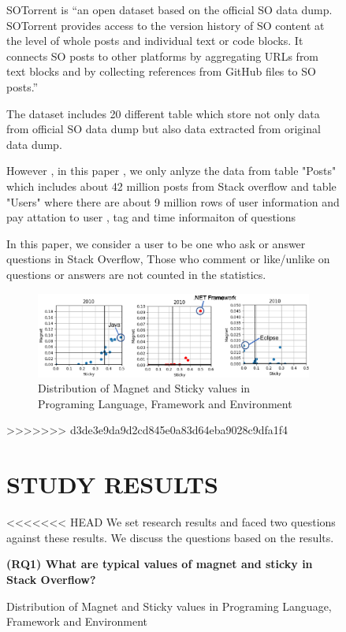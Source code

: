\documentclass[conference]{IEEEtran}
\begin{document}
\begin{figure}[t]
SOTorrent is “an open dataset based on the official SO data dump. SOTorrent provides access to the version history of SO content at the level of whole posts and individual text or code blocks. It connects SO posts to other platforms by aggregating URLs from text blocks and by collecting references from GitHub files to SO posts.”

The dataset includes 20 different table which store not only data from official SO data dump but also data extracted from original data dump.

However , in this paper , we only anlyze the data from table "Posts" which includes about 42 million posts from Stack overflow and table "Users" where there are about 9 million rows of user information and pay attation to user , tag and time informaiton of questions

In this paper, we consider a user to be one who ask or answer questions in Stack Overflow, Those who comment or like/unlike on questions or answers are not counted in the statistics.

\begin{figure}[t]
 \centering
 \includegraphics[width=.9\hsize]{img/2010magsti.eps}  
 \caption{Distribution of Magnet and Sticky values in Programing Language, Framework and Environment} 
 \label{plotframe2010} 
\end{figure}

>>>>>>> d3de3e9da9d2cd845e0a83d64eba9028c9dfa1f4

\smallskip
\smallskip



\section{STUDY RESULTS} %
<<<<<<< HEAD
We set research results and faced two questions against these results. We discuss the questions based on the results.
\smallskip
\smallskip

\textbf{(RQ1) What are typical values of magnet and sticky in Stack Overflow?}
\smallskip


\end{figure}
\end{document}
